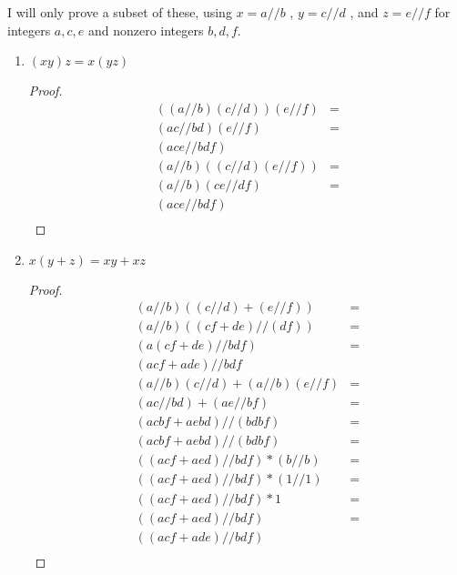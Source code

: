 \documentclass[../../main.tex]{subfiles}
\begin{document}
I will only prove a subset of these, using $x = a // b$ , $y = c // d$ , and $z = e // f$ for integers $a, c, e$ and nonzero integers $b, d, f$.
\begin{enumerate}
    \item
        \begin{q}
            $(x y)z = x(yz)$
        \end{q}
        \begin{proof}
            \begin{align*}
                ((a // b)(c // d))(e // f) &= \\
                (ac // bd)(e // f) &= \\
                (ace // bdf) & \\
                (a // b)((c // d)(e // f)) &= \\
                (a // b)(ce // df) &= \\
                (ace // bdf) &\\
            \end{align*}
        \end{proof}
    \item 
        \begin{q}
            $x(y + z) = x y + x z$
        \end{q}
        \begin{proof}
            \begin{align*}
                (a // b)((c // d) + (e // f)) &= \\
                (a // b)((cf + de) // (df)) &= \\
                (a(cf + de) // bdf) &= \\
                (acf + ade) // bdf & \\
                (a // b)(c // d) + (a // b)(e // f) & =\\
                (ac // bd) + (ae // bf) &= \\
                (acbf + aebd) // (bdbf) &= \\
                (acbf + aebd) // (bdbf) &= \\
                ((acf + aed) // bdf) * (b // b) &= \\
                ((acf + aed) // bdf) * (1 // 1) &= \\
                ((acf + aed) // bdf) * 1 &= \\
                ((acf + aed) // bdf) &= \\
                ((acf + ade) // bdf) & \\
            \end{align*}
        \end{proof} 
\end{enumerate}
\end{document}
